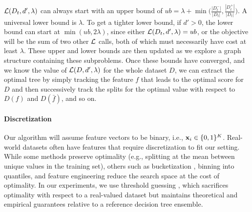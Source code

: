 $\mathcal{L}(D_t, d', \lambda)$ can always start with an upper bound of $ub = \lambda + \min\Big(\frac{|D_t^-|}{|D_t|}, \frac{|D_t^+|}{|D_t|}\Big)$. A universal lower bound is $\lambda$. To get a tighter lower bound, if $d' > 0$, the lower bound can start at $\min(ub, 2 \lambda)$, since either $\mathcal{L}(D_t, d', \lambda) = ub$, or the objective will be the sum of two other $\mathcal{L}$ calls, both of which must necessarily have cost at least $\lambda$. 
These upper and lower bounds are then updated as we explore a graph structure containing these subproblems. Once these bounds have converged, and we know the value of $\mathcal{L}(D, d', \lambda)$ for the whole dataset $D$, we can extract the optimal tree by simply tracking the feature $f$ that leads to the optimal score for $D$ and then successively track the splits for the optimal value with respect to $D(f)$ and $D(\bar{f})$, and so on. 

\paragraph{Discretization}
Our algorithm will assume feature vectors to be binary, i.e., $\mathbf{x}_i \in \{0,1\}^K$. Real-world datasets often have features that require discretization to fit our setting. While some methods preserve optimality (e.g., splitting at the mean between unique values in the training set), others such as bucketization \citep[described and proven to be suboptimal in][]{gosdt}, binning into quantiles, and feature engineering reduce the search space at the cost of optimality. In our experiments, we use threshold guessing \citep{gosdt_guesses}, which sacrifices optimality with respect to a real-valued dataset but maintains theoretical and empirical guarantees relative to a reference decision tree ensemble. 
